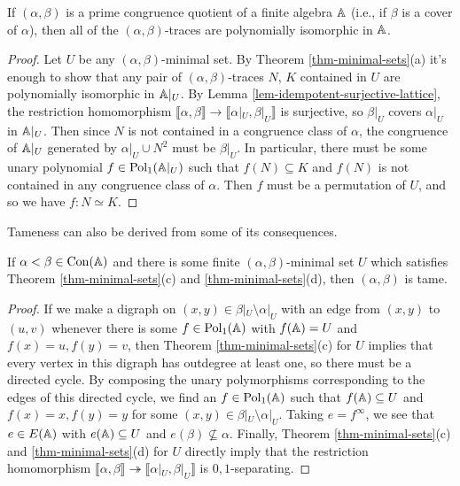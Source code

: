 \begin{appendices}
\begin{prop} If $(\alpha,\beta)$ is a prime congruence quotient of a finite algebra $\mathbb{A}$ (i.e., if $\beta$ is a cover of $\alpha$), then all of the $(\alpha,\beta)$-traces are polynomially isomorphic in $\mathbb{A}$.
\end{prop}
\begin{proof} Let $U$ be any $(\alpha,\beta)$-minimal set. By Theorem \ref{thm-minimal-sets}(a) it's enough to show that any pair of $(\alpha,\beta)$-traces $N$, $K$ contained in $U$ are polynomially isomorphic in $\mathbb{A}|_U$. By Lemma \ref{lem-idempotent-surjective-lattice}, the restriction homomorphism $\llbracket \alpha, \beta \rrbracket \rightarrow \llbracket \alpha|_U, \beta|_U \rrbracket$ is surjective, so $\beta|_U$ covers $\alpha|_U$ in $\mathbb{A}|_U$. Then since $N$ is not contained in a congruence class of $\alpha$, the congruence of $\mathbb{A}|_U$ generated by $\alpha|_U \cup N^2$ must be $\beta|_U$. In particular, there must be some unary polynomial $f \in \operatorname{Pol}_1(\mathbb{A}|_U)$ such that $f(N) \subseteq K$ and $f(N)$ is not contained in any congruence class of $\alpha$. Then $f$ must be a permutation of $U$, and so we have $f : N \simeq K$.
\end{proof}

Tameness can also be derived from some of its consequences.

\begin{prop} If $\alpha < \beta \in \operatorname{Con}(\mathbb{A})$ and there is some finite $(\alpha,\beta)$-minimal set $U$ which satisfies Theorem \ref{thm-minimal-sets}(c) and \ref{thm-minimal-sets}(d), then $(\alpha,\beta)$ is tame.
\end{prop}
\begin{proof} If we make a digraph on $(x,y) \in \beta|_U\setminus\alpha|_U$ with an edge from $(x,y)$ to $(u,v)$ whenever there is some $f \in \operatorname{Pol}_1(\mathbb{A})$ with $f(\mathbb{A}) = U$ and $f(x) = u, f(y) = v$, then Theorem \ref{thm-minimal-sets}(c) for $U$ implies that every vertex in this digraph has outdegree at least one, so there must be a directed cycle. By composing the unary polymorphisms corresponding to the edges of this directed cycle, we find an $f \in \operatorname{Pol}_1(\mathbb{A})$ such that $f(\mathbb{A}) \subseteq U$ and $f(x) = x, f(y) = y$ for some $(x,y) \in \beta|_U\setminus\alpha|_U$. Taking $e = f^\infty$, we see that $e \in E(\mathbb{A})$ with $e(\mathbb{A}) \subseteq U$ and $e(\beta) \not\subseteq \alpha$. Finally, Theorem \ref{thm-minimal-sets}(c) and \ref{thm-minimal-sets}(d) for $U$ directly imply that the restriction homomorphism $\llbracket \alpha, \beta \rrbracket \twoheadrightarrow \llbracket \alpha|_U, \beta|_U \rrbracket$ is $0,1$-separating.
\end{proof}


\end{appendices}
